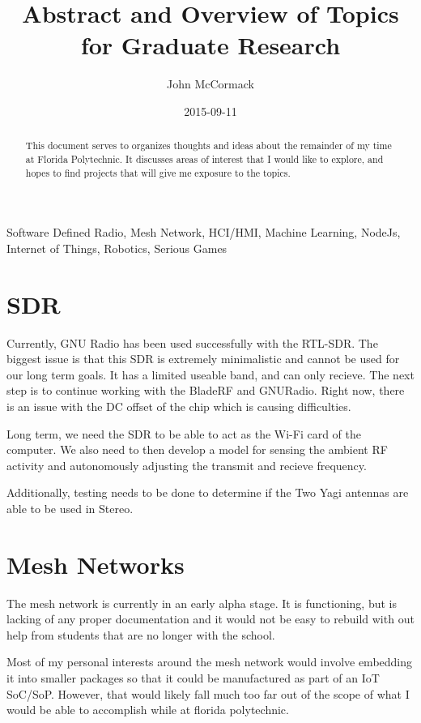 \documentclass{IEEEtran}
\title{Abstract and Overview of Topics for Graduate Research}
\date{2015-09-11}
\author{John McCormack}
\begin{document}
\maketitle

\begin{abstract}
	This document serves to organizes thoughts and ideas about
the remainder of my time at Florida Polytechnic. It discusses areas of interest
that I would like to explore, and hopes to find projects that will give me
exposure to the topics. 
\end{abstract}
\begin{IEEEkeywords}
Software Defined Radio, Mesh Network, HCI/HMI, Machine Learning, NodeJs, 
Internet of Things, Robotics, Serious Games
\end{IEEEkeywords}
\section{SDR}
Currently, GNU Radio has been used successfully with the RTL-SDR. The biggest
issue is that this SDR is extremely minimalistic and cannot be used for our
long term goals. It has a limited useable band, and can only recieve. The next
step is to continue working with the BladeRF and GNURadio. Right now, there is an 
issue with the DC offset of the chip which is causing difficulties. 

Long term, we need the SDR to be able to act as the Wi-Fi card of the computer. 
We also need to then develop a model for sensing the ambient RF activity and
autonomously adjusting the transmit and recieve frequency. 

Additionally, testing needs to be done to determine if the Two Yagi antennas are
able to be used in Stereo. 

\section{Mesh Networks}

The mesh network is currently in an early alpha stage. It is functioning, but
is lacking of any proper documentation and it would not be easy to rebuild
with out help from students that are no longer with the school. 

Most of my personal interests around the mesh network would involve embedding it 
into smaller packages so that it could be manufactured as part of an IoT SoC/SoP. 
However, that would likely fall much too far out of the scope of what I would be
able to accomplish while at florida polytechnic. 
\end{document}
